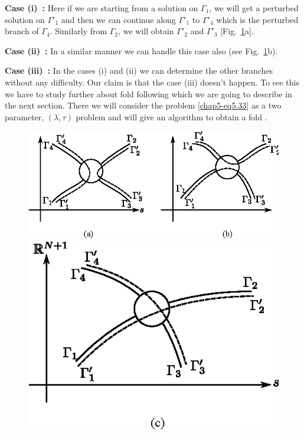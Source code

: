 \medskip
\noindent
{\bf Case (i)~:}
 Here if we are starting from a solution on $\Gamma_1$, we will get a
 perturbed solution on $\Gamma'_1$ and then we can continue along
 $\Gamma'_1$ to $\Gamma'_4$ which is the perturbed branch of
 $\Gamma_4$. Similarly from $\Gamma_2$, we will obtain $\Gamma'_2$ and
 $\Gamma'_3$ [Fig.~\ref{chap5-fig5.5}a]. 
\smallskip

\noindent
{\bf Case (ii)~:}
In a similar manner we can handle this case also (see
Fig.~\ref{chap5-fig5.5}b).  

\noindent
{\bf Case (iii)~:}
In the cases (i) and (ii) we can determine the other branches
  without any difficulty. Our claim is that the case (iii) doesn't
  happen. To see this we have to study further about fold following
  which we are going to describe in the next section. There we will
  consider the problem \eqref{chap5-eq5.33} as a two parameter, 
$(\lambda,\tau)$ problem and will give an algorithm to obtain a fold . 

\begin{figure}[H]
\centering
\includegraphics{vol79-fig/fig79-29ab.eps}

\bigskip
\smallskip

\includegraphics{vol79-fig/fig79-29c.eps}

\smallskip
\caption{}\label{chap5-fig5.5}
\end{figure}\pageoriginale

